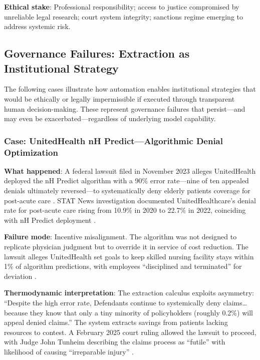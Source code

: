 \textbf{Ethical stake}: Professional responsibility; access to justice compromised by unreliable legal research; court system integrity; sanctions regime emerging to address systemic risk.

\subsection{Governance Failures: Extraction as Institutional Strategy}

The following cases illustrate how automation enables institutional strategies that would be ethically or legally impermissible if executed through transparent human decision-making. These represent governance failures that persist---and may even be exacerbated---regardless of underlying model capability.

\subsubsection{Case: UnitedHealth nH Predict---Algorithmic Denial Optimization}

\textbf{What happened}: A federal lawsuit filed in November 2023 alleges UnitedHealth deployed the nH Predict algorithm with a 90\% error rate---nine of ten appealed denials ultimately reversed---to systematically deny elderly patients coverage for post-acute care \citep{cbsnews2023united}. STAT News investigation documented UnitedHealthcare's denial rate for post-acute care rising from 10.9\% in 2020 to 22.7\% in 2022, coinciding with nH Predict deployment \citep{statnews2023medicare}.

\textbf{Failure mode}: Incentive misalignment. The algorithm was not designed to replicate physician judgment but to override it in service of cost reduction. The lawsuit alleges UnitedHealth set goals to keep skilled nursing facility stays within 1\% of algorithm predictions, with employees ``disciplined and terminated'' for deviation \citep{cbsnews2023united}.

\textbf{Thermodynamic interpretation}: The extraction calculus exploits asymmetry: ``Despite the high error rate, Defendants continue to systemically deny claims\ldots because they know that only a tiny minority of policyholders (roughly 0.2\%) will appeal denied claims.'' The system extracts savings from patients lacking resources to contest. A February 2025 court ruling allowed the lawsuit to proceed, with Judge John Tunheim describing the claims process as ``futile'' with likelihood of causing ``irreparable injury'' \citep{courthousenews2025united}.

